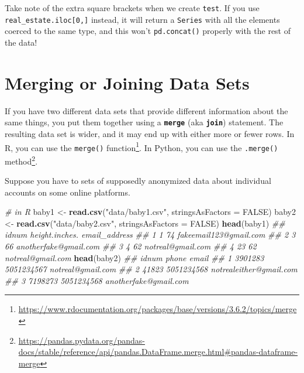 \documentclass[12pt,krantz2]{krantz}
\makeatletter
\newenvironment{Shaded}{\begin{snugshade}}{\end{snugshade}}
\newcommand{\CommentTok}[1]{\textcolor[rgb]{0.37,0.37,0.37}{\textit{#1}}}
\newcommand{\DataTypeTok}[1]{\textcolor[rgb]{0.27,0.27,0.27}{#1}}
\newcommand{\KeywordTok}[1]{\textcolor[rgb]{0.27,0.27,0.27}{\textbf{#1}}}
\newcommand{\NormalTok}[1]{#1}
\newcommand{\OtherTok}[1]{\textcolor[rgb]{0.37,0.37,0.37}{#1}}
\newcommand{\StringTok}[1]{\textcolor[rgb]{0.5,0.5,0.5}{#1}}
\renewcommand{\href}[2]{#2\footnote{\url{#1}}}
\newenvironment{kframe}{%
\medskip{}
\setlength{\fboxsep}{.8em}
 \def\at@end@of@kframe{}%
 \ifinner\ifhmode%
  \def\at@end@of@kframe{\end{minipage}}%
  \begin{minipage}{\columnwidth}%
 \fi\fi%
 \def\FrameCommand##1{\hskip\@totalleftmargin \hskip-\fboxsep
 \colorbox{shadecolor}{##1}\hskip-\fboxsep
     \hskip-\linewidth \hskip-\@totalleftmargin \hskip\columnwidth}%
 \MakeFramed {\advance\hsize-\width
   \@totalleftmargin\z@ \linewidth\hsize
   \@setminipage}}%
 {\par\unskip\endMakeFramed%
 \at@end@of@kframe}
\renewenvironment{Shaded}{\begin{kframe}}{\end{kframe}}
\makeatother
\begin{document}
Take note of the extra square brackets when we create \texttt{test}. If you use \texttt{real\_estate.iloc{[}0,{]}} instead, it will return a \texttt{Series} with all the elements coerced to the same type, and this won't \texttt{pd.concat()} properly with the rest of the data!

\hypertarget{merging-or-joining-data-sets}{%
\section{Merging or Joining Data Sets}\label{merging-or-joining-data-sets}}

If you have two different data sets that provide different information about the same things, you put them together using a \textbf{\texttt{merge}} (aka \textbf{\texttt{join}}) statement. The resulting data set is wider, and it may end up with either more or fewer rows. In R, you can use the \href{https://www.rdocumentation.org/packages/base/versions/3.6.2/topics/merge}{\texttt{merge()} function}. In Python, you can use the \href{https://pandas.pydata.org/pandas-docs/stable/reference/api/pandas.DataFrame.merge.html\#pandas-dataframe-merge}{\texttt{.merge()} method}.

Suppose you have to sets of supposedly anonymized data about individual accounts on some online platforms.

\begin{Shaded}
\begin{Highlighting}[]
\CommentTok{# in R}
\NormalTok{baby1 <-}\StringTok{ }\KeywordTok{read.csv}\NormalTok{(}\StringTok{"data/baby1.csv"}\NormalTok{, }\DataTypeTok{stringsAsFactors =} \OtherTok{FALSE}\NormalTok{)}
\NormalTok{baby2 <-}\StringTok{ }\KeywordTok{read.csv}\NormalTok{(}\StringTok{"data/baby2.csv"}\NormalTok{, }\DataTypeTok{stringsAsFactors =} \OtherTok{FALSE}\NormalTok{)}
\KeywordTok{head}\NormalTok{(baby1)}
\CommentTok{##   idnum height.inches.          email_address}
\CommentTok{## 1     1             74 fakeemail123@gmail.com}
\CommentTok{## 2     3             66  anotherfake@gmail.com}
\CommentTok{## 3     4             62      notreal@gmail.com}
\CommentTok{## 4    23             62      notreal@gmail.com}
\KeywordTok{head}\NormalTok{(baby2)}
\CommentTok{##     idnum      phone                   email}
\CommentTok{## 1 3901283 5051234567       notreal@gmail.com}
\CommentTok{## 2   41823 5051234568 notrealeither@gmail.com}
\CommentTok{## 3 7198273 5051234568   anotherfake@gmail.com}
\end{Highlighting}
\end{Shaded}
\end{document}
